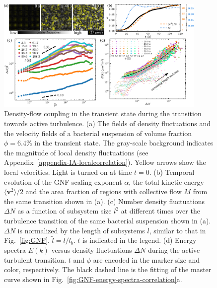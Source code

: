 \documentclass[twocolumn,aps,prx,amsmath,amssymb,longbibliography]{revtex4-2}
\begin{document}
\begin{figure}[t]
\begin{center}
\includegraphics[width=0.9\textwidth]{figures/fig-6.pdf}
\caption[The correlation between GNF and kinetic energy and kinetic energy spectra at transient state]
{
Density-flow coupling in the transient state during the transition towards active turbulence.
(a) The fields of density fluctuations and the velocity fields of a bacterial suspension of volume fraction $\phi=6.4\%$ in the transient state. The gray-scale background indicates the magnitude of local density fluctuations (see Appendix~\ref{appendix-IA-localcorrelation}). Yellow arrows show the local velocities. Light is turned on at time $t = 0$.
(b) Temporal evolution of the GNF scaling exponent $\alpha$, the total kinetic energy $\langle \bm{v}^2 \rangle/2$ and the area fraction of regions with collective flow $M$ from the same transition shown in (a).
(c) Number density fluctuations $\Delta N$ as a function of subsystem size $l^2$ at different times over the turbulence transition of the same bacterial suspension shown in (a). $\Delta N$ is normalized by the length of subsystems $l$, similar to that in Fig.~\ref{fig:GNF}. $\tilde{l} = l/l_b$. $t$ is indicated in the legend.
(d) Energy spectra $E(k)$ versus density fluctuations $\Delta N$ during the active turbulent transition. $t$ and $\phi$ are encoded in the marker size and color, respectively. The black dashed line is the fitting of the master curve shown in Fig.~\ref{fig:GNF-energy-spectra-correlation}a.
}
\label{fig:GNF-energy-spectra-correlation-transient}
\end{center}
\end{figure}
\end{document}
